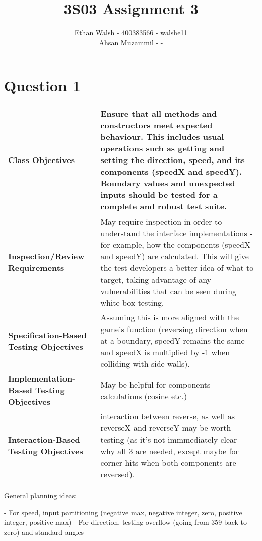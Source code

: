 \documentclass{article}
\title{3S03 Assignment 3}
\author{Ethan Walsh - 400383566 - walshe11 \\ Ahsan Muzammil - -}
\begin{document}
\maketitle
\section*{Question 1}

\begin{table}[h]
    \renewcommand{\arraystretch}{1.2}
    \setlength{\extrarowheight}{2pt} 
    \centering
    \begin{tabularx}{\textwidth}{ |X|X| } 
        \hline
        \textbf{Class Objectives} & Ensure that all methods and constructors meet expected behaviour. This includes usual operations such as getting and setting the direction, speed, and its components (speedX and speedY). Boundary values and unexpected inputs should be tested for a complete and robust test suite. \\ 
        \hline
        \textbf{Inspection/Review Requirements} & May require inspection in order to understand the interface implementations - for example, how the components (speedX and speedY) are calculated. This will give the test developers a better idea of what to target, taking advantage of any vulnerabilities that can be seen during white box testing. \\ 
        \hline
        \textbf{Specification-Based Testing Objectives} & Assuming this is more aligned with the game's function (reversing direction when at a boundary, speedY remains the same and speedX is multiplied by -1 when colliding with side walls). \\ 
        \hline
        \textbf{Implementation-Based Testing Objectives} & May be helpful for components calculations (cosine etc.) \\ 
        \hline
        \textbf{Interaction-Based Testing Objectives} & interaction between reverse, as well as reverseX and reverseY may be worth testing (as it's not immmediately clear why all 3 are needed, except maybe for corner hits when both components are reversed). \\ 
        \hline
    \end{tabularx}
\end{table}

General planning ideas:

- For speed, input partitioning (negative max, negative integer, zero, positive integer, positive max)
- For direction, testing overflow (going from 359 back to zero) and standard angles
\end{document}
